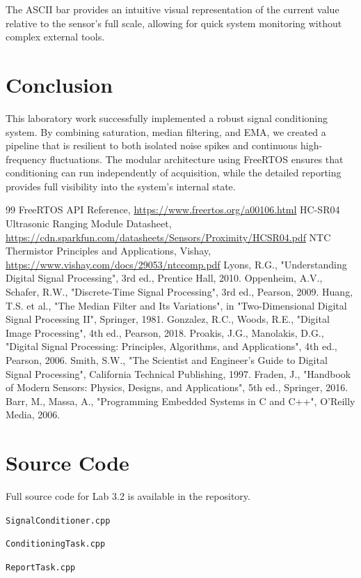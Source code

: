 The ASCII bar provides an intuitive visual representation of the current value relative to the sensor's full scale, allowing for quick system monitoring without complex external tools.

\section{Conclusion}

This laboratory work successfully implemented a robust signal conditioning system. By combining saturation, median filtering, and EMA, we created a pipeline that is resilient to both isolated noise spikes and continuous high-frequency fluctuations. The modular architecture using FreeRTOS ensures that conditioning can run independently of acquisition, while the detailed reporting provides full visibility into the system's internal state.

\begin{thebibliography}{99}
 FreeRTOS API Reference, \url{https://www.freertos.org/a00106.html}
 HC-SR04 Ultrasonic Ranging Module Datasheet, \url{https://cdn.sparkfun.com/datasheets/Sensors/Proximity/HCSR04.pdf}
 NTC Thermistor Principles and Applications, Vishay, \url{https://www.vishay.com/docs/29053/ntccomp.pdf}
 Lyons, R.G., "Understanding Digital Signal Processing", 3rd ed., Prentice Hall, 2010.
 Oppenheim, A.V., Schafer, R.W., "Discrete-Time Signal Processing", 3rd ed., Pearson, 2009.
 Huang, T.S. et al., "The Median Filter and Its Variations", in "Two-Dimensional Digital Signal Processing II", Springer, 1981.
 Gonzalez, R.C., Woods, R.E., "Digital Image Processing", 4th ed., Pearson, 2018.
 Proakis, J.G., Manolakis, D.G., "Digital Signal Processing: Principles, Algorithms, and Applications", 4th ed., Pearson, 2006.
 Smith, S.W., "The Scientist and Engineer's Guide to Digital Signal Processing", California Technical Publishing, 1997.
 Fraden, J., "Handbook of Modern Sensors: Physics, Designs, and Applications", 5th ed., Springer, 2016.
 Barr, M., Massa, A., "Programming Embedded Systems in C and C++", O'Reilly Media, 2006.
\end{thebibliography}

\appendix
\section{Source Code}
Full source code for Lab 3.2 is available in the repository.

\texttt{SignalConditioner.cpp}


\texttt{ConditioningTask.cpp}


\texttt{ReportTask.cpp}

